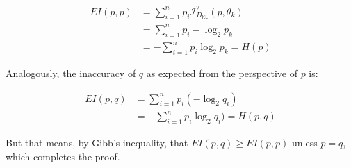 \documentclass[
  10pt,
  dvipsnames,enabledeprecatedfontcommands]{scrartcl}
\newcommand{\dkl}{D_{\mathsf{KL}}} %
\begin{document}
\begin{align*}
EI(p,p) & = \sum_{i =1}^n p_i \mathcal{I}_{\dkl}^2(p, \theta_k) \\
& = \sum_{i =1}^n  p_i - \log_2 p_k \\
& = - \sum_{i =1}^n  p_i  \log_2 p_k = H(p)
\end{align*}

\noindent Analogously, the inaccuracy of \(q\) as expected from the
perspective of \(p\) is:

\begin{align*}
EI(p, q) & =   \sum_{i =1}^n p_i \left( - \log_2 q_i\right)\\
& = -  \sum_{i =1}^n p_i  \log_2 q_i) = H(p,q)
\end{align*}

But that means, by Gibb's inequality, that \(EI(p,q) \geq EI(p,p)\)
unless \(p=q\), which completes the proof.
\end{document}
